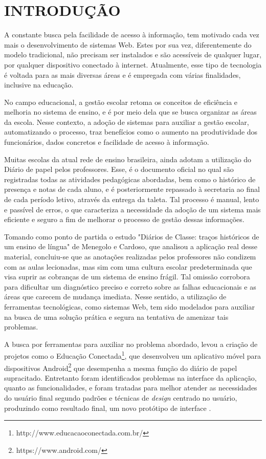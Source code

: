 \chapter{INTRODUÇÃO}
\label{cap:introducao}


A constante busca pela facilidade de acesso à informação, tem motivado cada vez mais o desenvolvimento de sistemas Web. Estes por sua vez, diferentemente do modelo tradicional, não precisam ser instalados e são acessíveis de qualquer lugar, por qualquer dispositivo conectado à internet. Atualmente, esse tipo de tecnologia é voltada para as mais diversas áreas e é empregada com várias finalidades, inclusive na educação.

No campo educacional, a gestão escolar retoma os conceitos de eficiência e melhoria no sistema de ensino, e é por meio dela que se busca organizar as áreas da escola. Nesse contexto, a adoção de sistemas para auxiliar a gestão escolar, automatizando o processo, traz benefícios como o aumento na produtividade dos funcionários, dados concretos e facilidade de acesso à informação. 


Muitas escolas da atual rede de ensino brasileira, ainda adotam a utilização do Diário de papel pelos professores. Esse, é o documento oficial no qual são registradas todas as atividades pedagógicas abordadas, bem como o histórico de presença e notas de cada aluno, e é posteriormente repassado à secretaria ao final de cada período letivo, através da entrega da taleta. Tal processo é manual, lento e passível de erros, o que caracteriza a necessidade da adoção de um sistema mais eficiente e seguro a fim de melhorar o processo de gestão dessas informações.



Tomando como ponto de partida o estudo "Diários de Classe: traços históricos de um ensino de língua" de Menegolo e Cardoso, que analisou a aplicação real desse material, concluiu-se que as anotações realizadas pelos professores não condizem com as aulas lecionadas, mas sim com uma cultura escolar predeterminada que visa suprir as cobranças de um sistema de ensino frágil. Tal omissão corrobora para dificultar um diagnóstico preciso e correto sobre as falhas educacionais e as áreas que carecem de mudança imediata. Nesse sentido, a utilização de ferramentas tecnológicas, como sistemas Web, tem sido modelados para auxiliar na busca de uma solução prática e segura na tentativa de amenizar tais problemas.



A busca por ferramentas para auxiliar no problema abordado, levou a criação de projetos como o Educação Conectada\footnote{http://www.educacaoconectada.com.br/}, que desenvolveu um aplicativo móvel para dispositivos Android\footnote{https://www.android.com/} que desempenha a mesma função do diário de papel supracitado. Entretanto foram identificados problemas na interface da aplicação, quanto as funcionalidades, e foram tratadas para melhor atender as necessidades do usuário final segundo padrões e técnicas de \textit{design} centrado no usuário, produzindo como resultado final, um novo protótipo de interface \cite{igor2016}.



